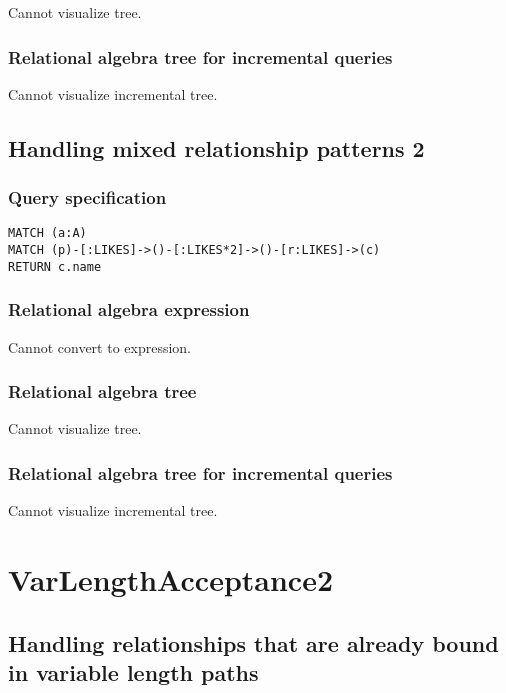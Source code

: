 Cannot visualize tree.

\subsubsection*{Relational algebra tree for incremental queries}

Cannot visualize incremental tree.

\subsection{Handling mixed relationship patterns 2}

\subsubsection*{Query specification}

\begin{lstlisting}
MATCH (a:A)
MATCH (p)-[:LIKES]->()-[:LIKES*2]->()-[r:LIKES]->(c)
RETURN c.name
\end{lstlisting}

\subsubsection*{Relational algebra expression}

Cannot convert to expression.

\subsubsection*{Relational algebra tree}

Cannot visualize tree.

\subsubsection*{Relational algebra tree for incremental queries}

Cannot visualize incremental tree.

\section{VarLengthAcceptance2}

\subsection{Handling relationships that are already bound in variable length paths}

